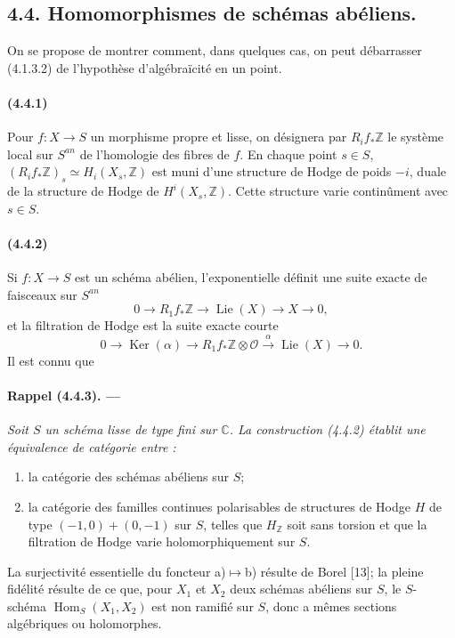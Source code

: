 \documentclass[10pt]{article}
\newcommand{\C}{\mathbb C}
\newcommand{\Z}{\mathbb Z}
\newcommand{\Ker}{\operatorname{Ker}}
\newcommand{\Hom}{\operatorname{Hom}}
\providecommand{\Lie}{\operatorname{Lie}}
\providecommand{\cO}{\mathcal O}
\providecommand{\cO}{\mathcal O}
\begin{document}
\subsection*{4.4. Homomorphismes de schémas abéliens.}

On se propose de montrer comment, dans quelques cas, on peut débarrasser (4.1.3.2) de l'hypothèse d'algébraïcité en un point.

\paragraph{(4.4.1)} Pour $f:X\to S$ un morphisme propre et lisse, on désignera par $R_if_*\Z$ le système local sur $S^{an}$ de l'homologie des fibres de $f$. En chaque point $s\in S$, $(R_if_*\Z)_s\simeq H_i(X_s,\Z)$ est muni d'une structure de Hodge de poids $-i$, duale de la structure de Hodge de $H^i(X_s,\Z)$. Cette structure varie continûment avec $s\in S$.

\paragraph{(4.4.2)} Si $f:X\to S$ est un schéma abélien, l'exponentielle définit une suite exacte de faisceaux sur $S^{an}$
\[
0\to R_1f_*\Z\to\Lie(X)\to X\to0,
\]
et la filtration de Hodge est la suite exacte courte
\[
0\to\Ker(\alpha)\to R_1f_*\Z\otimes\cO\xrightarrow{\alpha}\Lie(X)\to0.
\]
Il est connu que

\paragraph{Rappel (4.4.3). ---} {\itshape Soit $S$ un schéma lisse de type fini sur $\C$. La construction (4.4.2) établit une équivalence de catégorie entre :
\begin{enumerate}[label=\alph*)]
\item la catégorie des schémas abéliens sur $S$;
\item la catégorie des familles continues polarisables de structures de Hodge $H$ de type $(-1,0)+(0,-1)$ sur $S$, telles que $H_\Z$ soit sans torsion et que la filtration de Hodge varie holomorphiquement sur $S$.
\end{enumerate}}
La surjectivité essentielle du foncteur a)$\mapsto$b) résulte de Borel [13]; la pleine fidélité résulte de ce que, pour $X_1$ et $X_2$ deux schémas abéliens sur $S$, le $S$-schéma $\Hom_S(X_1,X_2)$ est non ramifié sur $S$, donc a mêmes sections algébriques ou holomorphes.
\end{document}
